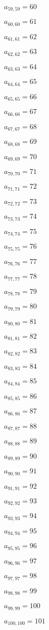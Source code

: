 \documentclass[a4paper,12pt]{article}
\begin{document}
$a _{ 59, 59 } = 60$

$a _{ 60, 60 } = 61$

$a _{ 61, 61 } = 62$

$a _{ 62, 62 } = 63$

$a _{ 63, 63 } = 64$

$a _{ 64, 64 } = 65$

$a _{ 65, 65 } = 66$

$a _{ 66, 66 } = 67$

$a _{ 67, 67 } = 68$

$a _{ 68, 68 } = 69$

$a _{ 69, 69 } = 70$

$a _{ 70, 70 } = 71$

$a _{ 71, 71 } = 72$

$a _{ 72, 72 } = 73$

$a _{ 73, 73 } = 74$

$a _{ 74, 74 } = 75$

$a _{ 75, 75 } = 76$

$a _{ 76, 76 } = 77$

$a _{ 77, 77 } = 78$

$a _{ 78, 78 } = 79$

$a _{ 79, 79 } = 80$

$a _{ 80, 80 } = 81$

$a _{ 81, 81 } = 82$

$a _{ 82, 82 } = 83$

$a _{ 83, 83 } = 84$

$a _{ 84, 84 } = 85$

$a _{ 85, 85 } = 86$

$a _{ 86, 86 } = 87$

$a _{ 87, 87 } = 88$

$a _{ 88, 88 } = 89$

$a _{ 89, 89 } = 90$

$a _{ 90, 90 } = 91$

$a _{ 91, 91 } = 92$

$a _{ 92, 92 } = 93$

$a _{ 93, 93 } = 94$

$a _{ 94, 94 } = 95$

$a _{ 95, 95 } = 96$

$a _{ 96, 96 } = 97$

$a _{ 97, 97 } = 98$

$a _{ 98, 98 } = 99$

$a _{ 99, 99 } = 100$

$a _{ 100, 100 } = 101$
\end{document}
